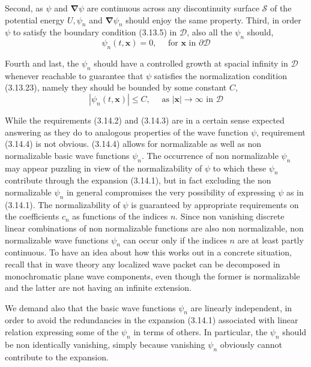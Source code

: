 \documentclass{article}
\begin{document}
Second, as $\psi$ and $\boldsymbol{\nabla} \psi$ are continuous across any discontinuity surface $\mathcal{S}$ of the potential energy $U, \psi_{n}$ and $\boldsymbol{\nabla} \psi_{n}$ should enjoy the same property. Third, in order $\psi$ to satisfy the boundary condition (3.13.5) in $\mathcal{D}$, also all the $\psi_{n}$ should,
$$
\begin{equation*}
\psi_{n}(t, \boldsymbol{x})=0, \quad \text { for } \boldsymbol{x} \text { in } \partial \mathcal{D} \tag{3.14.3}
\end{equation*}
$$

Fourth and last, the $\psi_{n}$ should have a controlled growth at spacial infinity in $\mathcal{D}$ whenever reachable to guarantee that $\psi$ satisfies the normalization condition (3.13.23), namely they should be bounded by some constant $C$,
$$
\begin{equation*}
\left|\psi_{n}(t, \boldsymbol{x})\right| \leq C, \quad \text { as }|\boldsymbol{x}| \rightarrow \infty \text { in } \mathcal{D} \tag{3.14.4}
\end{equation*}
$$

While the requirements (3.14.2) and (3.14.3) are in a certain sense expected answering as they do to analogous properties of the wave function $\psi$, requirement (3.14.4) is not obvious. (3.14.4) allows for normalizable as well as non normalizable basic wave functions $\psi_{n}$. The occurrence of non normalizable $\psi_{n}$ may appear puzzling in view of the normalizability of $\psi$ to which these $\psi_{n}$ contribute through the expansion (3.14.1), but in fact excluding the non normalizable $\psi_{n}$ in general compromises the very possibility of expressing $\psi$ as in (3.14.1). The normalizability of $\psi$ is guaranteed by appropriate requirements on the coefficients $c_{n}$ as functions of the indices $n$. Since non vanishing discrete linear combinations of non normalizable functions are also non normalizable, non normalizable wave functions $\psi_{n}$ can occur only if the indices $n$ are at least partly continuous. To have an idea about how this works out in a concrete situation, recall that in wave theory any localized wave packet can be decomposed in monochromatic plane wave components, even though the former is normalizable and the latter are not having an infinite extension.

We demand also that the basic wave functions $\psi_{n}$ are linearly independent, in order to avoid the redundancies in the expansion (3.14.1) associated with linear relation expressing some of the $\psi_{n}$ in terms of others. In particular, the $\psi_{n}$ should be non identically vanishing, simply because vanishing $\psi_{n}$ obviously cannot contribute to the expansion.
\end{document}
